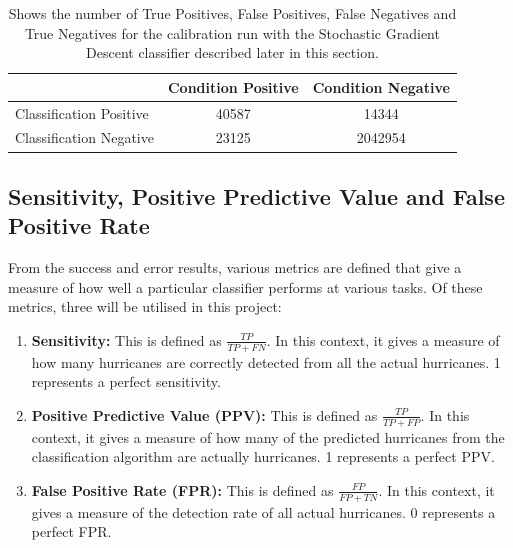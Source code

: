 \documentclass[pdftex,12pt,a4paper]{report}
\begin{document}
\begin{table}[hb!]
    \centering
    \begin{tabular}{ l | c c }
                                & Condition Positive & Condition Negative \\
        \hline
        Classification Positive & \SI{40587}{} & \SI{14344}{} \\
        Classification Negative & \SI{23125}{} & \SI{2042954}{} \\
    \end{tabular}
    \caption{Shows the number of True Positives, False Positives, False Negatives and True Negatives
        for the calibration run with the Stochastic Gradient Descent classifier described later in this
        section. }
    \label{tab:tf_np_table}
\end{table}

\newpage
\subsection{Sensitivity, Positive Predictive Value and False Positive Rate}

From the success and error results, various metrics are defined that give a measure of how well a
particular classifier performs at various tasks. Of these metrics, three will be utilised in this
project:

\begin{enumerate}
    \item \textbf{Sensitivity:} This is defined as $\frac{TP}{TP + FN}$. In this context, it gives a
        measure of how many hurricanes are correctly detected from all the actual hurricanes. 1
        represents a perfect sensitivity.
    \item \textbf{Positive Predictive Value (PPV):} This is defined as $\frac{TP}{TP + FP}$. In this
        context, it gives a measure of how many of the predicted hurricanes from the classification
        algorithm are actually hurricanes. 1 represents a perfect PPV.
    \item \textbf{False Positive Rate (FPR):} This is defined as $\frac{FP}{FP + TN}$. In this
        context, it gives a measure of the detection rate of all actual hurricanes. 0 represents a
        perfect FPR.
\end{enumerate}
\end{document}
